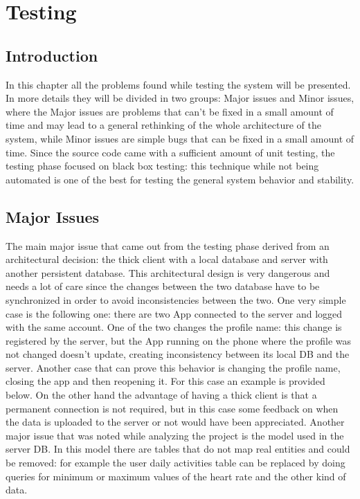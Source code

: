 \section{Testing}

\subsection{Introduction}

In this chapter all the problems found while testing the system will be presented. In more details they will be divided in two groups: Major issues and Minor issues, where the Major issues are problems that can't be fixed in a small amount of time and may lead to a general rethinking of the whole architecture of the system, while Minor issues are simple bugs that can be fixed in a small amount of time.
Since the source code came with a sufficient amount of unit testing, the testing phase focused on black box testing: this technique while not being automated is one of the best for testing the general system behavior and stability.

\subsection{Major Issues}
The main major issue that came out from the testing phase derived from an architectural decision: the thick client with a local database and server with another persistent database. This architectural design is very dangerous and needs a lot of care since the changes between the two database have to be synchronized in order to avoid inconsistencies between the two.
One very simple case is the following one: there are two App connected to the server and logged with the same account. One of the two changes the profile name: this change is registered by the server, but the App running on the phone where the profile was not changed doesn't update, creating inconsistency between its local DB and the server.
Another case that can prove this behavior is changing the profile name, closing the app and then reopening it. For this case an example is provided below.
On the other hand the advantage of having a thick client is that a permanent connection is not required, but in this case some feedback on when the data is uploaded to the server or not would have been appreciated.
Another major issue that was noted while analyzing the project is the model used in the server DB. In this model there are tables that do not map real entities and could be removed: for example the user daily activities table can be replaced by doing queries for minimum or maximum values of the heart rate and the other kind of data.


